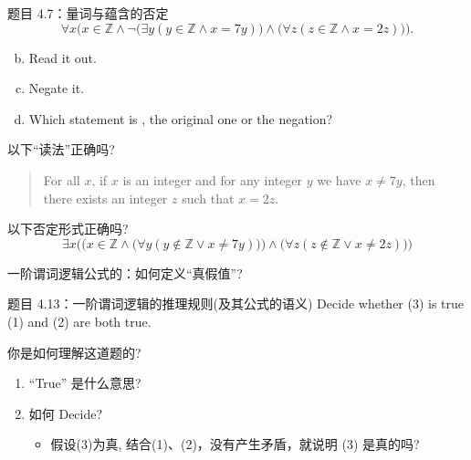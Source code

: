 \begin{frame}{}
  \begin{exampleblock}{题目 4.7：量词与蕴含的否定}
    \[
      \forall x \Big(x \in \mathbb{Z} \land \lnot\big(\exists y (y \in \mathbb{Z} \land x = 7y)\big)
	\land \big(\forall z (z \in \mathbb{Z} \land x = 2z)\big)\Big).
    \]
    \vspace{-0.60cm}
    \begin{enumerate}[(a)]
      \setcounter{enumi}{1}
        \item Read it out.
      \setcounter{enumi}{0}
        \item Negate it.
      \setcounter{enumi}{2}
	\item Which statement is , the original one or the negation?
    \end{enumerate}
  \end{exampleblock}

  \pause
  \vspace{0.20cm}
  以下``读法''正确吗?
  \begin{quote}
    For all $x$, if $x$ is an integer and for any integer $y$ we have $x \neq 7y$,
    then there exists an integer $z$ such that $x = 2z$.
  \end{quote}

  \pause
  以下否定形式正确吗?
  \[
    \exists x \Big( \big(x \in \mathbb{Z} \land \big(\forall y (y \notin \mathbb{Z} \lor x \neq 7y)\big) \big) 
    \land \big(\forall z (z \notin \mathbb{Z} \lor x \neq 2z) \big) \Big)
  \]

  \pause
  一阶谓词逻辑公式的：如何定义``真假值''?
\end{frame}

\begin{frame}{}
  \begin{exampleblock}{题目 4.13：一阶谓词逻辑的推理规则(及其公式的语义)}
    Decide whether (3) is true  (1) and (2) are both true.
  \end{exampleblock}

  \pause
  \vspace{0.50cm}
  你是如何理解这道题的?
  
  \begin{enumerate}
    \item ``True'' 是什么意思?
    \item 如何 Decide?
      \begin{itemize}
	\item 假设(3)为真, 结合(1)、(2)，没有产生矛盾，就说明 (3) 是真的吗?
      \end{itemize}
  \end{enumerate}
\end{frame}

